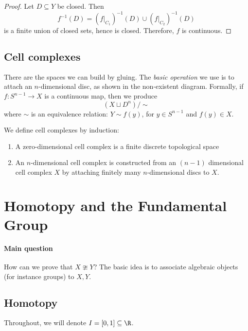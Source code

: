 \documentclass{article}
\numberwithin{nthm}{subsection}
\begin{document}
\begin{proof}
    Let $D \subseteq Y$ be closed.  Then
    \begin{equation*}
        f^{-1}(D) = (f|_{C_1})^{-1} (D) \cup (f|_{C_2})^{-1} (D)
    \end{equation*}
    is a finite union of closed sets, hence is closed.  Therefore, $f$ is continuous.
\end{proof}

\subsection{Cell complexes}
There are the spaces we can build by gluing.  The \emph{basic operation} we use is to attach an $n$-dimensional disc, as shown in the non-existent diagram. %
Formally, if $f: S^{n-1} \to X$ is a continuous map, then we produce
\begin{equation*}
    (X \sqcup D^n) / \sim
\end{equation*}
where $\sim$ is an equivalence relation: $Y \sim f(y)$, for $y \in S^{n-1}$ and $f(y) \in X$.
\begin{defi}
    We define cell complexes by induction:
    \begin{enumerate}[label=(\roman*)]
        \item A zero-dimensional cell complex is a finite discrete topological space
        \item An $n$-dimensional cell complex is constructed from an $(n-1)$ dimensional cell complex $X$ by attaching finitely many $n$-dimensional discs to $X$.
    \end{enumerate}
\end{defi}

\clearpage

\section{Homotopy and the Fundamental Group}
\paragraph{Main question} How can we prove that $X \ncong Y$?
The basic idea is to associate algebraic objects (for instance groups) to $X, Y$.

\subsection{Homotopy}
Throughout, we will denote $I = [0, 1] \subseteq \R$.
\end{document}

